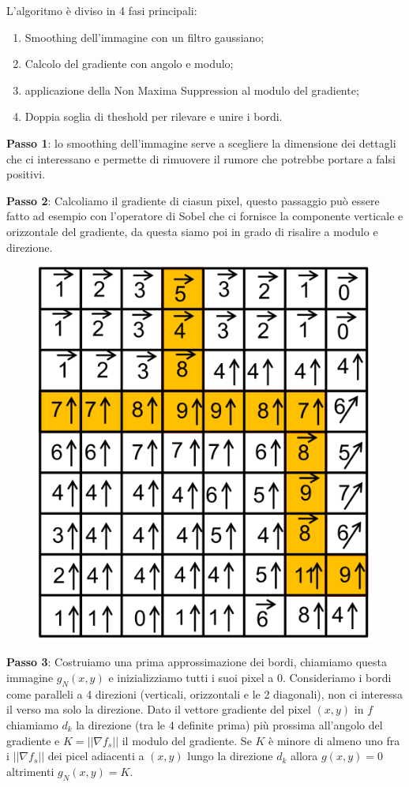 L'algoritmo è diviso in 4 fasi principali:
\begin{enumerate}
	\item Smoothing dell'immagine con un filtro gaussiano;
	\item Calcolo del gradiente con angolo e modulo;
	\item applicazione della Non Maxima Suppression al modulo del gradiente;
	\item Doppia soglia di theshold per rilevare e unire i bordi.
\end{enumerate}

\textbf{Passo 1}: lo smoothing dell'immagine serve a scegliere la dimensione dei dettagli che ci interessano e permette di rimuovere il rumore che potrebbe portare a falsi positivi.

\textbf{Passo 2}: Calcoliamo il gradiente di ciasun pixel, questo passaggio può essere fatto ad esempio con l'operatore di Sobel che ci fornisce la componente verticale e orizzontale del gradiente, da questa siamo poi in grado di risalire a modulo e direzione.

\begin{figure}
	\vspace{-.3cm}
	\centering
	\includegraphics[width=.95\linewidth]{Picture/Canny}
\end{figure}
\textbf{Passo 3}: Costruiamo una prima approssimazione dei bordi, chiamiamo questa immagine $g_N(x,y)$ e inizializziamo tutti i suoi pixel a 0. Consideriamo i bordi come paralleli a 4 direzioni (verticali, orizzontali e le 2 diagonali), non ci interessa il verso ma solo la direzione. Dato il vettore gradiente del pixel $(x,y)$ in $f$ chiamiamo $d_k$ la direzione (tra le 4 definite prima) più prossima all'angolo del gradiente e $K = ||\nabla f_s||$ il modulo del gradiente. Se $K$ è minore di almeno uno fra i $||\nabla f_s||$
dei picel adiacenti a $(x,y)$ lungo la direzione $d_k$ allora $g(x,y) = 0$ altrimenti $g_N(x,y) = K$.


